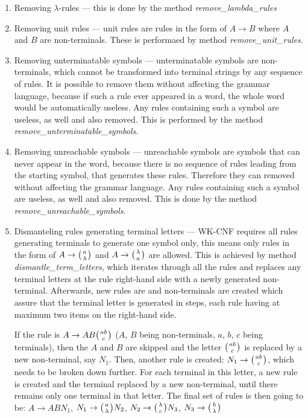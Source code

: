 \begin{enumerate}
  \item{Removing $\lambda$-rules --- this is done by the method \textit{remove\_lambda\_rules}}

  \item{Removing unit rules --- unit rules are rules in the form of $A \rightarrow B$ where $A$ and $B$ are non-terminals. These is performaed by method \textit{remove\_unit\_rules}.}

  \item{Removing unterminatable symbols --- unterminatable symbols are non-terminals, which cannot be transformed into terminal strings by any sequence of rules. It is possible to remove them without affecting the grammar language, because if such a rule ever appeared in a word, the whole word would be automatically useless. Any rules containing such a symbol are useless, as well and also removed. This is performed by the method \textit{remove\_unterminatable\_symbols}.}

  \item{Removing unreachable symbols --- unreachable symbols are symbols that can never appear in the word, because there is no sequence of rules leading from the starting symbol, that generates these rules. Therefore they can removed without affecting the grammar language. Any rules containing such a symbol are useless, as well and also removed. This is done by the method \textit{remove\_unreachable\_symbols}.}

  \item{Dismanteling rules generating terminal letters --- WK-CNF requires all rules generating terminals to generate one symbol only, this means only rules in the form of $A \rightarrow \wkpair{a}{\lambda}$ and $A \rightarrow \wkpair{\lambda}{a}$ are allowed. This is achieved by method \textit{dismantle\_term\_letters}, which iterates through all the rules and replaces any terminal letters at the rule right-hand side with a newly generated non-terminal. Afterwards, new rules are and non-terminals are created which assure that the terminal letter is generated in steps, each rule having at maximum two items on the right-hand side.

  If the rule is $A \rightarrow A B \wkpair{ab}{c}$ ($A$, $B$ being non-terminals, $a$, $b$, $c$ being terminals), then the $A$ and $B$ are skipped and the letter $\wkpair{ab}{c}$ is replaced by a new non-terminal, say $N_1$. Then, another rule is created: $N_1 \rightarrow \wkpair{ab}{c}$, which needs to be broken down further. For each terminal in this letter, a new rule is created and the terminal replaced by a new non-terminal, until there remains only one terminal in that letter. The final set of rules is then going to be: $A \rightarrow A B N_1$, $N_1 \rightarrow \wkpair{a}{\lambda} N_2$, $N_2 \rightarrow \wkpair{\lambda}{c} N_3$, $N_3 \rightarrow \wkpair{b}{\lambda}$
  }


\end{enumerate}
